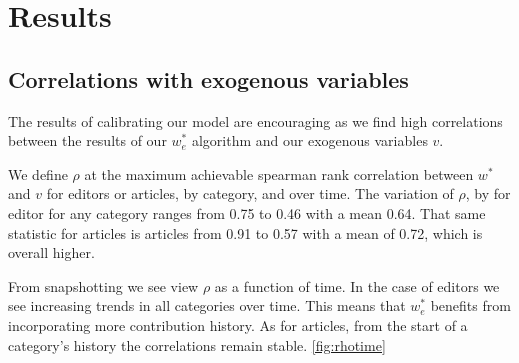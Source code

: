 \section{Results}


\subsection{Correlations with exogenous variables}

The results of calibrating our model are encouraging as we find high correlations between the results of our $w^*_e$ algorithm and our exogenous variables $v$. 

We define $\rho$ at the maximum achievable spearman rank correlation between $w^*$ and $v$ for editors or articles, by category, and over time. The variation of $\rho$, by for editor for any category ranges from 0.75 to 0.46 with a mean 0.64.  That same statistic for articles is articles from 0.91 to 0.57 with a mean of 0.72, which is overall higher.

 
From snapshotting we see view $\rho$ as  a function of time. In the case of editors we see increasing trends in all categories over time. This means that $w^*_e$ benefits from incorporating more contribution history. As for articles, from the start of a category's history the correlations remain stable. \ref{fig:rhotime}

